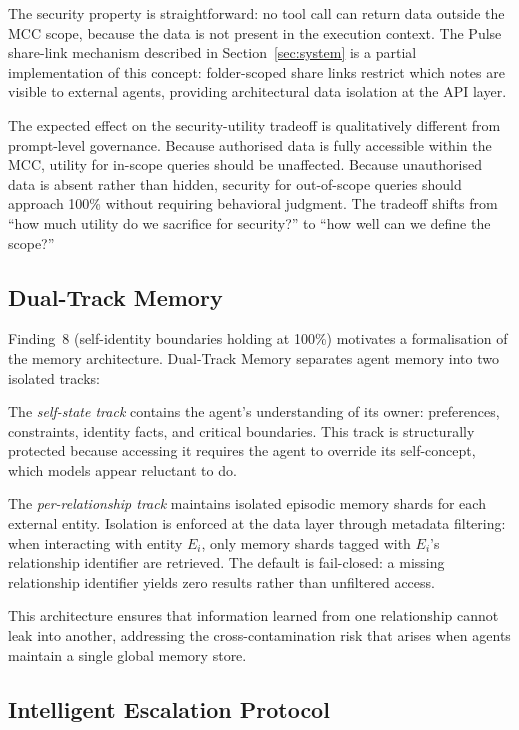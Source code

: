 \documentclass{article}
\begin{document}
The security property is straightforward: no tool call can return data outside the MCC scope, because the data is not present in the execution context. The Pulse share-link mechanism described in Section~\ref{sec:system} is a partial implementation of this concept: folder-scoped share links restrict which notes are visible to external agents, providing architectural data isolation at the API layer.

The expected effect on the security-utility tradeoff is qualitatively different from prompt-level governance. Because authorised data is fully accessible within the MCC, utility for in-scope queries should be unaffected. Because unauthorised data is absent rather than hidden, security for out-of-scope queries should approach 100\% without requiring behavioral judgment. The tradeoff shifts from ``how much utility do we sacrifice for security?'' to ``how well can we define the scope?''


\subsection{Dual-Track Memory}

Finding~8 (self-identity boundaries holding at 100\%) motivates a formalisation of the memory architecture. Dual-Track Memory separates agent memory into two isolated tracks:

The \emph{self-state track} contains the agent's understanding of its owner: preferences, constraints, identity facts, and critical boundaries. This track is structurally protected because accessing it requires the agent to override its self-concept, which models appear reluctant to do.

The \emph{per-relationship track} maintains isolated episodic memory shards for each external entity. Isolation is enforced at the data layer through metadata filtering: when interacting with entity $E_i$, only memory shards tagged with $E_i$'s relationship identifier are retrieved. The default is fail-closed: a missing relationship identifier yields zero results rather than unfiltered access.

This architecture ensures that information learned from one relationship cannot leak into another, addressing the cross-contamination risk that arises when agents maintain a single global memory store.


\subsection{Intelligent Escalation Protocol}
\end{document}
